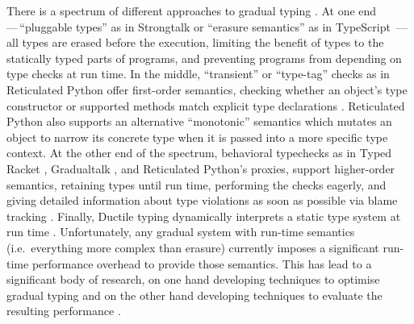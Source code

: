 \documentclass[sigplan,10pt,review,screen]{acmart}\settopmatter{printfolios=true}
\begin{document}
There is a spectrum of different approaches to gradual typing
\cite{kafka18,bensurvey18icfp}.
At one end\,---\,``pluggable types'' as in Strongtalk \cite{strongtalk} or ``erasure
semantics'' as in 
TypeScript
\citep{typeScriptECOOP}\,---\,
%
all types are erased before the execution, limiting the benefit of
types to the statically typed parts of programs, and preventing
programs from depending on type checks at run time.  In the middle,
``transient'' or ``type-tag'' checks as in Reticulated Python 
offer first-order semantics, checking
whether an object's type constructor or supported methods match
explicit type declarations
\cite{Siek2007,Bloom2009,concrete15,reticPython2014,Greenman2018}.
Reticulated Python also supports an alternative ``monotonic'' semantics
which mutates an object to narrow its concrete type when it is passed
into a more specific type context.
At the other end of the spectrum, behavioral
typechecks as in Typed Racket \cite{typedScheme08,takikawa2012},
Gradualtalk \cite{gradualtalk14},
and Reticulated Python's proxies,
support higher-order semantics, retaining
types until run 
time, performing the checks eagerly, and giving detailed information
about type violations as soon as possible via blame
tracking \cite{blame2009,blameForAll2011}.
Finally, Ductile typing
dynamically interprets a static type system at run time
\cite{Ductile2011}.
%
%
Unfortunately, any gradual system with run-time semantics
(i.e.\ everything more complex than erasure) currently
imposes a significant run-time performance overhead to provide those
semantics.  This has lead to a significant body of research,
on one hand developing techniques to optimise gradual typing 
\citep{Vitousek2017,Muehlboeck2017,Bauman2017,Richards2017,Greenman2018}
and on the other hand developing techniques to evaluate the
resulting performance  \cite{Takikawa2016,Greenman2019jfp}.
\end{document}
